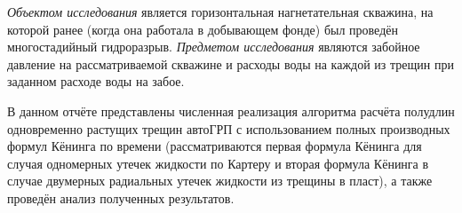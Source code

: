 \emph{Объектом исследования} является горизонтальная нагнетательная скважина, на которой ранее (когда она работала в добывающем фонде) был проведён многостадийный гидроразрыв.
\emph{Предметом исследования} являются забойное давление на рассматриваемой скважине и расходы воды на каждой из трещин при заданном расходе воды на забое.

В данном отчёте представлены численная реализация алгоритма расчёта полудлин одновременно растущих трещин автоГРП с использованием полных производных формул Кёнинга \cite{koning_book} по времени (рассматриваются первая формула Кёнинга для случая одномерных утечек жидкости по Картеру \cite{karter_book} и вторая формула Кёнинга в случае двумерных радиальных утечек жидкости из трещины в пласт), а также проведён анализ полученных результатов.
